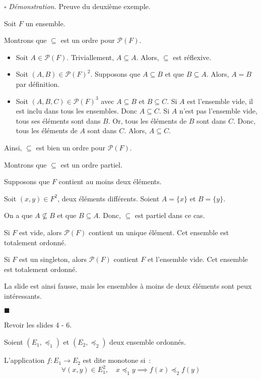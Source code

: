 \documentclass[a4paper, titlepage]{article}
\renewenvironment{proof}{\par$\square$ \footnotesize\textit{Démonstration.}}{\begin{flushright}$\blacksquare$\end{flushright}\par}
\begin{document}
    \begin{proof}
        Preuve du deuxième exemple.

        Soit $F$ un ensemble.

        Montrons que $\subseteq$ est un ordre pour $\mathcal{P}(F)$.
        \begin{itemize}
            \item Soit $A\in\mathcal{P}(F)$.
                Triviallement, $A\subseteq A$.
                Alors, $\subseteq$ est réflexive.
            \item Soit $(A,B)\in\mathcal{P}(F)^2$.
                Supposons que $A\subseteq B$ et que $B\subseteq A$.
                Alors, $A=B$ par définition.
            \item Soit $(A,B,C)\in\mathcal{P}(F)^3$ avec $A\subseteq B$ et $B\subseteq C$.
                Si $A$ est l'ensemble vide, il est inclu dans tous les ensembles. 
                Donc $A\subseteq C$.
                Si $A$ n'est pas l'ensemble vide, tous ses éléments sont dans $B$. 
                Or, tous les éléments de $B$ sont dans $C$.
                Donc, tous les éléments de $A$ sont dans $C$.
                Alors, $A\subseteq C$.
        \end{itemize}
        Ainsi, $\subseteq$ est bien un ordre pour $\mathcal{P}(F)$.

        Montrons que $\subseteq$ est un ordre partiel.

        Supposons que $F$ contient au moins deux éléments.

        Soit $(x,y)\in F^2$, deux éléments différents.
        Soient $A=\{x\}$ et $B=\{y\}$.

        On a que $A\not\subseteq B$ et que $B\subseteq A$.
        Donc, $\subseteq$ est partiel dans ce cas.

        Si $F$ est vide, alors $\mathcal{P}(F)$ contient un unique élément.
        Cet ensemble est totalement ordonné.

        Si $F$ est un singleton, alors $\mathcal{P}(F)$ contient $F$ et l'ensemble vide.
        Cet ensemble est totalement ordonné.

        La slide est ainsi fausse, mais les ensembles à moins de deux éléments sont peux intéressants.
    \end{proof}
    Revoir les slides 4 - 6.
    \begin{defn}
        Soient $(E_1,\preceq_1)$ et $(E_2,\preceq_2)$ deux ensemble ordonnés.

        L'application $f:E_1\to E_2$ est dite monotone si~:
        $$ \forall (x,y)\in E_1^2,\quad x\preceq_1 y \implies f(x)\preceq_2 f(y) $$
    \end{defn}
\end{document}
